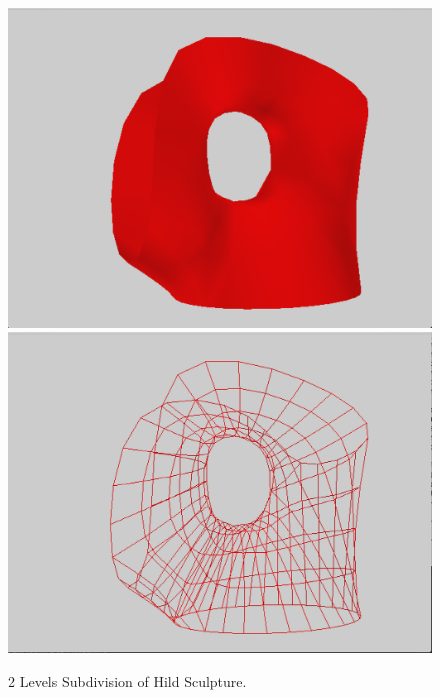 \documentclass[12pt]{article}
\begin{document}
\begin{figure}[h!]
  \centering
    \includegraphics[width=\textwidth]{Hild2}
    \includegraphics[width=\textwidth]{Hild2w}
  \caption{2 Levels Subdivision of Hild Sculpture.} \label{figure:Hild2}
\end{figure}
\end{document}
